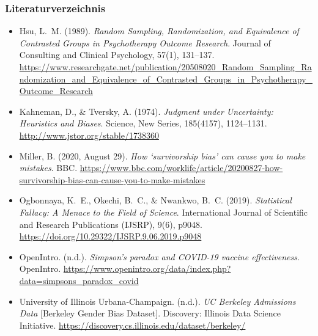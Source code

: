 \documentclass{beamer}
\renewcommand{\footnotesize}{\tiny}
\begin{document}
\begin{frame}
\frametitle{Literaturverzeichnis}
\footnotesize
\begin{itemize}
    \item Hsu, L.\ M. (1989). \textit{Random Sampling, Randomization, and Equivalence of Contrasted Groups in Psychotherapy Outcome Research}. Journal of Consulting and Clinical Psychology, 57(1), 131–137.  
    \url{https://www.researchgate.net/publication/20508020_Random_Sampling_Randomization_and_Equivalence_of_Contrasted_Groups_in_Psychotherapy_Outcome_Research}
    \item Kahneman, D., \& Tversky, A. (1974). \textit{Judgment under Uncertainty: Heuristics and Biases}. Science, New Series, 185(4157), 1124–1131.  
    \url{http://www.jstor.org/stable/1738360}
    \item Miller, B. (2020, August 29). \textit{How ‘survivorship bias’ can cause you to make mistakes}. BBC.  
    \url{https://www.bbc.com/worklife/article/20200827-how-survivorship-bias-can-cause-you-to-make-mistakes}
    \item Ogbonnaya, K.\ E., Okechi, B.\ C., \& Nwankwo, B.\ C. (2019). \textit{Statistical Fallacy: A Menace to the Field of Science}. International Journal of Scientific and Research Publications (IJSRP), 9(6), p9048.  
    \url{https://doi.org/10.29322/IJSRP.9.06.2019.p9048}
    \item OpenIntro. (n.d.). \textit{Simpson’s paradox and COVID-19 vaccine effectiveness}. OpenIntro.  
    \url{https://www.openintro.org/data/index.php?data=simpsons_paradox_covid}
    \item University of Illinois Urbana‑Champaign. (n.d.). \textit{UC Berkeley Admissions Data} [Berkeley Gender Bias Dataset]. Discovery: Illinois Data Science Initiative.  
    \url{https://discovery.cs.illinois.edu/dataset/berkeley/}
\end{itemize}
\end{frame}
\end{document}
